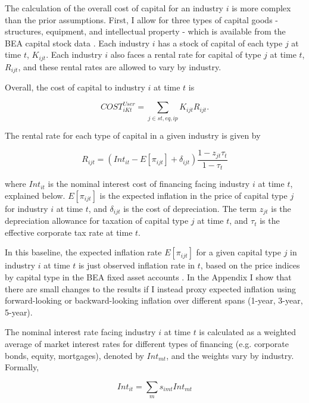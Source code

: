\documentclass[11pt]{article}
\begin{document}
The calculation of the overall cost of capital for an industry $i$ is more complex than the prior assumptions. First, I allow for three types of capital goods - structures, equipment, and intellectual property - which is available from the BEA capital stock data \citep{beacap,beagov}. Each industry $i$ has a stock of capital of each type $j$ at time $t$, $K_{ijt}$. Each industry $i$ also faces a rental rate for capital of type $j$ at time $t$, $R_{ijt}$, and these rental rates are allowed to vary by industry.

Overall, the cost of capital to industry $i$ at time $t$ is

\begin{equation}
	COST^{User}_{iKt} = \sum_{j \in st,eq,ip} K_{ijt} R_{ijt}.
\end{equation}

The rental rate for each type of capital in a given industry is given by

\begin{equation}
	R_{ijt} = (Int_{it} - E[\pi_{ijt}] + \delta_{ijt})\frac{1-z_{jt} \tau_t}{1-\tau_t}
\end{equation}

where $Int_{it}$ is the nominal interest cost of financing facing industry $i$ at time $t$, explained below. $E[\pi_{ijt}]$ is the expected inflation in the price of capital type $j$ for industry $i$ at time $t$, and $\delta_{ijt}$ is the cost of depreciation. The term $z_{jt}$ is the depreciation allowance for taxation of capital type $j$ at time $t$, and $\tau_t$ is the effective corporate tax rate at time $t$.

In this baseline, the expected inflation rate $E[\pi_{ijt}]$ for a given capital type $j$ in industry $i$ at time $t$ is just observed inflation rate in $t$, based on the price indices by capital type in the BEA fixed asset accounts \citep{beacap,beagov}. In the Appendix I show that there are small changes to the results if I instead proxy expected inflation using forward-looking or backward-looking inflation over different spans (1-year, 3-year, 5-year).

The nominal interest rate facing industry $i$ at time $t$ is calculated as a weighted average of market interest rates for different types of financing (e.g. corporate bonds, equity, mortgages), denoted by $Int_{mt}$, and the weights vary by industry. Formally,

\begin{equation}
    Int_{it} = \sum_m s_{imt} Int_{mt}
\end{equation} 
\end{document}
